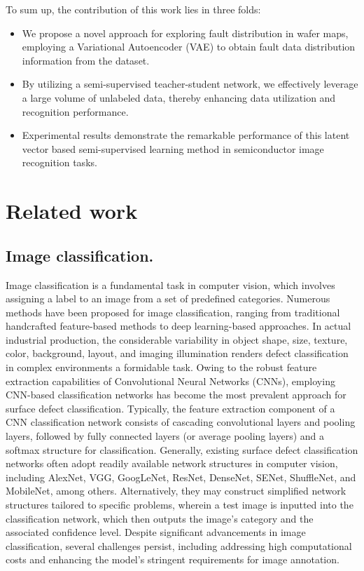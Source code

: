 \documentclass[conference]{IEEEtran}
\begin{document}
To sum up, the contribution of this work lies in three folds:
\begin{itemize}
\vspace{-0.1in}
\setlength{\itemsep}{0pt}
\setlength{\parsep}{0pt}
\setlength{\parskip}{0pt}
\item  We propose a novel approach for exploring fault distribution in wafer maps, employing a Variational Autoencoder (VAE) to obtain fault data distribution information from the dataset.
%
\item By utilizing a semi-supervised teacher-student network, we effectively leverage a large volume of unlabeled data, thereby enhancing data utilization and recognition performance.
%
\item Experimental results demonstrate the remarkable performance of this latent vector based semi-supervised learning method in semiconductor image recognition tasks.
% 
\end{itemize}


\section{Related work}

\subsection{Image classification.}

Image classification is a fundamental task in computer vision, which involves assigning a label to an image from a set of predefined categories. Numerous methods have been proposed for image classification, ranging from traditional handcrafted feature-based methods to deep learning-based approaches. 
In actual industrial production, the considerable variability in object shape, size, texture, color, background, layout, and imaging illumination renders defect classification in complex environments a formidable task. Owing to the robust feature extraction capabilities of Convolutional Neural Networks (CNNs)\cite{lecun2015deep}, employing CNN-based classification networks has become the most prevalent approach for surface defect classification. Typically, the feature extraction component of a CNN classification network consists of cascading convolutional layers and pooling layers, followed by fully connected layers (or average pooling layers) and a softmax structure for classification. Generally, existing surface defect classification networks often adopt readily available network structures in computer vision, including AlexNet\cite{krizhevsky2017imagenet}, VGG\cite{simonyan2014very}, GoogLeNet\cite{szegedy2015going}, ResNet\cite{he2016deep}, DenseNet\cite{huang2017densely}, SENet\cite{hu2018squeeze}, ShuffleNet\cite{zhang2018shufflenet}, and MobileNet\cite{howard2017mobilenets}, among others. Alternatively, they may construct simplified network structures tailored to specific problems, wherein a test image is inputted into the classification network, which then outputs the image's category and the associated confidence level.
Despite significant advancements in image classification, several challenges persist, including addressing high computational costs and enhancing the model's stringent requirements for image annotation.
\end{document}
